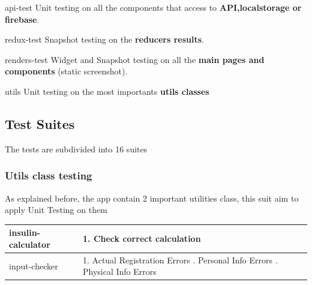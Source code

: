 \documentclass[12pt,hidelinks]{article}
\begin{document}
\begin{docCommand}{api-test}{}
	Unit testing on all the components that access to \textbf{API,localstorage or firebase}.
\end{docCommand}

\begin{docCommand}{redux-test}{}
	Snapshot testing on the \textbf{reducers results}.
\end{docCommand}

\begin{docCommand}{renders-test}{}
	Widget and Snapshot testing on all the \textbf{main pages and components} (static screenshot).
\end{docCommand}

\begin{docCommand}{utils}{}
   Unit testing on the most importants \textbf{utils classes}
\end{docCommand}

\subsection{Test Suites}
The tests are subdivided into 16 suites
\subsubsection*{Utils class testing}
As explained before, the app contain 2 important utilities class, this suit aim to apply Unit Testing on them
\begin{center} 
\begin{tabular}{ |p{4cm}|p{5cm}|  }
	\hline
	insulin-calculator & 
	1. Check correct calculation \\
	\hline
	input-checker & 
	1. Actual Registration Errors \newline    
	2. Personal Info Errors \newline    
	3. Physical Info Errors \newline     
	  \\
	\hline
\end{tabular}
\end{center}
\end{document}
